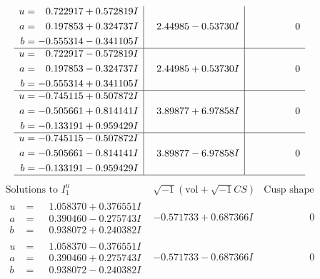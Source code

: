 \documentclass[1p]{elsarticle_modified}
\theoremstyle{definition}
\newcommand{\I}{\sqrt{-1}}
\begin{document}
$$\begin{array}{c|c|c}
\begin{aligned}
u &= \phantom{-}0.722917 + 0.572819 I \\
a &= \phantom{-}0.197853 + 0.324737 I \\
b &= -0.555314 - 0.341105 I\end{aligned}
 & \phantom{-}2.44985 - 0.53730 I & \phantom{-0.000000 } 0 \\ \hline\begin{aligned}
u &= \phantom{-}0.722917 - 0.572819 I \\
a &= \phantom{-}0.197853 - 0.324737 I \\
b &= -0.555314 + 0.341105 I\end{aligned}
 & \phantom{-}2.44985 + 0.53730 I & \phantom{-0.000000 } 0 \\ \hline\begin{aligned}
u &= -0.745115 + 0.507872 I \\
a &= -0.505661 + 0.814141 I \\
b &= -0.133191 + 0.959429 I\end{aligned}
 & \phantom{-}3.89877 + 6.97858 I & \phantom{-0.000000 } 0 \\ \hline\begin{aligned}
u &= -0.745115 - 0.507872 I \\
a &= -0.505661 - 0.814141 I \\
b &= -0.133191 - 0.959429 I\end{aligned}
 & \phantom{-}3.89877 - 6.97858 I & \phantom{-0.000000 } 0\\
 \hline 
 \end{array}$$\newpage$$\begin{array}{c|c|c}  
\text{Solutions to }I^u_{1}& \I (\text{vol} + \sqrt{-1}CS) & \text{Cusp shape}\\
 \hline 
\begin{aligned}
u &= \phantom{-}1.058370 + 0.376551 I \\
a &= \phantom{-}0.390460 - 0.275743 I \\
b &= \phantom{-}0.938072 + 0.240382 I\end{aligned}
 & -0.571733 + 0.687366 I & \phantom{-0.000000 } 0 \\ \hline\begin{aligned}
u &= \phantom{-}1.058370 - 0.376551 I \\
a &= \phantom{-}0.390460 + 0.275743 I \\
b &= \phantom{-}0.938072 - 0.240382 I\end{aligned}
 & -0.571733 - 0.687366 I & \phantom{-0.000000 } 0 \\ \hline\begin{aligned}

\end{aligned}
\end{array}$$
\end{document}
